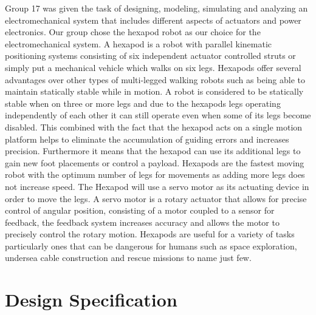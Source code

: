 
Group 17 was given the task of designing, modeling, simulating and analyzing an electromechanical system that includes different aspects of actuators and power electronics. Our group chose the hexapod robot as our choice for the electromechanical system. A hexapod is a robot with parallel kinematic positioning systems consisting of six independent actuator controlled struts or simply put a mechanical vehicle which walks on six legs. Hexapods offer several advantages over other types of multi-legged  walking robots such as being able to maintain statically stable while in motion. A robot is considered to be statically stable when on three or more legs and due to the hexapods legs operating independently of each other it can still operate even when some of its legs become disabled. This combined with the fact that the hexapod acts on a single motion platform helps to eliminate the accumulation of guiding errors and increases precision. Furthermore it means that  the hexapod can use its additional legs to gain new foot placements or control a payload. Hexapods are the fastest moving robot with the optimum number of legs for movements as adding more legs does not increase speed. The Hexapod will use a servo motor as its actuating device in order to move the legs. A servo motor is a rotary actuator that allows for precise control of angular position, consisting of a motor coupled to a sensor for feedback, the feedback system increases accuracy and allows the motor to precisely control the rotary motion. Hexapods are useful for a variety of tasks particularly ones that can be dangerous for humans such as space exploration, undersea cable construction and rescue missions to name just few. 









\section{Design Specification}




